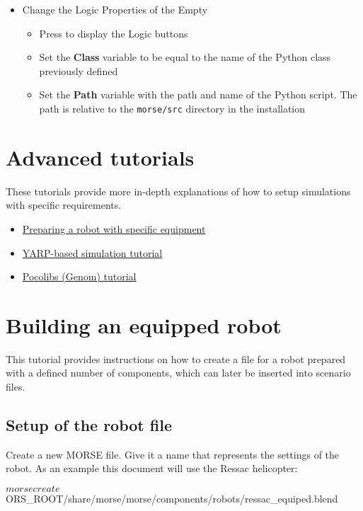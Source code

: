 \documentclass[twoside,a4paper,10pt]{report}
\newcommand{\key}[1]{\fcolorbox{Dark}{Light}{\textbf{#1}}}
\newcommand{\dokutitlelevelone}[1]{\chapter{#1}}
\newcommand{\dokutitleleveltwo}[1]{\section{#1}}
\newcommand{\dokubold}[1]{\textbf{#1}}
\newcommand{\dokumonospace}[1]{\texttt{#1}}
\newcommand{\dokuitem}{\item}
\begin{document}
\begin{itemize}
\dokuitem  Change the Logic Properties of the Empty
\begin{itemize}
\dokuitem  Press \key{F4} to display the Logic buttons
\dokuitem  Set the \dokubold{Class} variable to be equal to the name of the Python class previously defined
\dokuitem  Set the \dokubold{Path} variable with the path and name of the Python script. The path is relative to the \dokumonospace{morse/src} directory in the installation
\end{itemize}

\end{itemize}
\dokutitlelevelone{Advanced tutorials}
\label{1db3103f04a8f50e1168ef3c23748f71}%
\label{1db3103f04a8f50e1168ef3c23748f71}%

These tutorials provide more in-depth explanations of how to setup simulations with specific requirements.



\begin{itemize}
\dokuitem  \hyperref[feb94730bf2c8bc6803a472bb56691ae]{ Preparing a robot with specific equipment}
\dokuitem  \hyperref[1dd029a60f7f3dd1deaf993ce4538edf]{ YARP-based simulation tutorial}
\dokuitem  \hyperref[5c7d3aeca93d2be4626b023df992dc1d]{ Pocolibs (Genom) tutorial}
\end{itemize}

\dokutitlelevelone{Building an equipped robot}
\label{23e1989e63bbd01247feb36cca0a69e8}%
\label{feb94730bf2c8bc6803a472bb56691ae}%

This tutorial provides instructions on how to create a file for a robot prepared with a defined number of components, which can later be inserted into scenario files.


\dokutitleleveltwo{Setup of the robot file}
\label{bc8d7eea217f972d09e6a6c0b666fd98}%

Create a new MORSE file. Give it a name that represents the settings of the robot. As an example this document will use the Ressac helicopter:



\small
\begin{verbatimtab}
$ morse create $ORS_ROOT/share/morse/morse/components/robots/ressac_equiped.blend
\end{verbatimtab}
\normalsize
\end{document}
